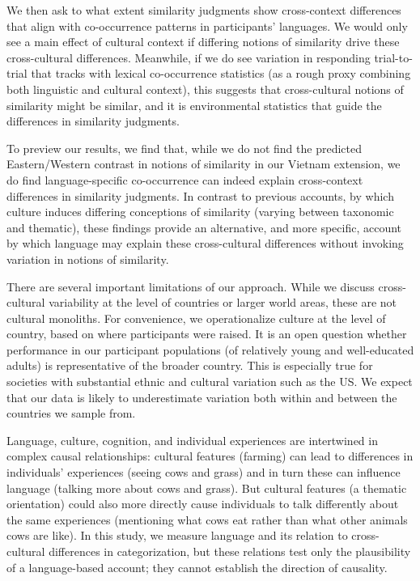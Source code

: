 \documentclass[10pt, letterpaper]{article}
\begin{document}
We then ask to what extent similarity judgments show cross-context
differences that align with co-occurrence patterns in participants'
languages. We would only see a main effect of cultural context if
differing notions of similarity drive these cross-cultural differences.
Meanwhile, if we do see variation in responding trial-to-trial that
tracks with lexical co-occurrence statistics (as a rough proxy combining
both linguistic and cultural context), this suggests that cross-cultural
notions of similarity might be similar, and it is environmental
statistics that guide the differences in similarity judgments.

To preview our results, we find that, while we do not find the predicted
Eastern/Western contrast in notions of similarity in our Vietnam
extension, we do find language-specific co-occurrence can indeed explain
cross-context differences in similarity judgments. In contrast to
previous accounts, by which culture induces differing conceptions of
similarity (varying between taxonomic and thematic), these findings
provide an alternative, and more specific, account by which language may
explain these cross-cultural differences without invoking variation in
notions of similarity.

There are several important limitations of our approach. While we
discuss cross-cultural variability at the level of countries or larger
world areas, these are not cultural monoliths. For convenience, we
operationalize culture at the level of country, based on where
participants were raised. It is an open question whether performance in
our participant populations (of relatively young and well-educated
adults) is representative of the broader country. This is especially
true for societies with substantial ethnic and cultural variation such
as the US. We expect that our data is likely to underestimate variation
both within and between the countries we sample from.

Language, culture, cognition, and individual experiences are intertwined
in complex causal relationships: cultural features (farming) can lead to
differences in individuals' experiences (seeing cows and grass) and in
turn these can influence language (talking more about cows and grass).
But cultural features (a thematic orientation) could also more directly
cause individuals to talk differently about the same experiences
(mentioning what cows eat rather than what other animals cows are like).
In this study, we measure language and its relation to cross-cultural
differences in categorization, but these relations test only the
plausibility of a language-based account; they cannot establish the
direction of causality.
\end{document}
